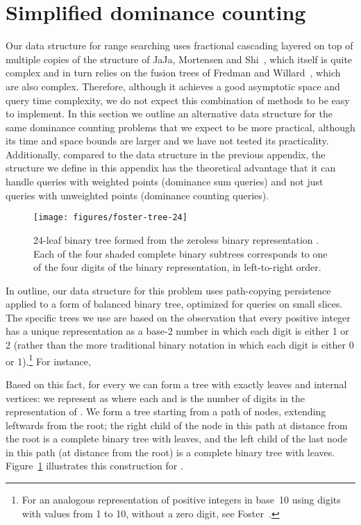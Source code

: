 \documentclass[11pt]{article}
\begin{document}
\section{Simplified dominance counting}
Our data structure for range searching uses fractional cascading layered on top of
multiple copies of the structure of JaJa, Mortensen and Shi~\cite{JaJMorShi-ISAAC-04}, which itself is quite complex and in turn relies on the fusion trees of Fredman and Willard~\cite{FreWil-JCSS-93}, which are also complex. Therefore, although it achieves a good asymptotic space and query time complexity, we do not expect this combination of methods to be easy to implement. In this section we outline an alternative data structure for the same dominance counting problems that we expect to be more practical, although its time and space bounds are larger and we have not tested its practicality. Additionally, compared to the data structure in the previous appendix, the structure we define in this appendix has the theoretical advantage that it can handle queries with weighted points (dominance sum queries) and not just queries with unweighted points (dominance counting queries).

\begin{figure}[t]
\centering\texttt{[image: figures/foster-tree-24]}
\caption{24-leaf binary tree formed from the zeroless binary representation . Each of the four shaded complete binary subtrees corresponds to one of the four digits of the binary representation, in left-to-right order.}
\label{fig:foster-tree-24}
\end{figure}

In outline, our data structure for this problem uses path-copying persistence~\cite{DSPersistent} applied to a form of balanced binary tree, optimized for queries on small slices.
The specific trees we use are based on the observation that every positive integer has a unique representation as a base-2 number in which each digit is either 1 or 2 (rather than the more traditional binary notation in which each digit is either 0 or 1).\footnote{For an analogous representation of positive integers in base~10 using digits with values from 1 to 10, without a zero digit, see Foster~\cite{Fos-MM-47}.} For instance,

Based on this fact, for every  we can form a tree  with exactly  leaves and  internal vertices: we represent  as  where each  and  is the number of digits in the representation of . We form a tree starting from a path of  nodes, extending leftwards from the root; the right child of the node in this path at distance  from the root is a complete binary tree with  leaves, and the left child of the last node in this path (at distance  from the root) is a complete binary tree with  leaves. Figure~\ref{fig:foster-tree-24} illustrates this construction for .
\end{document}
